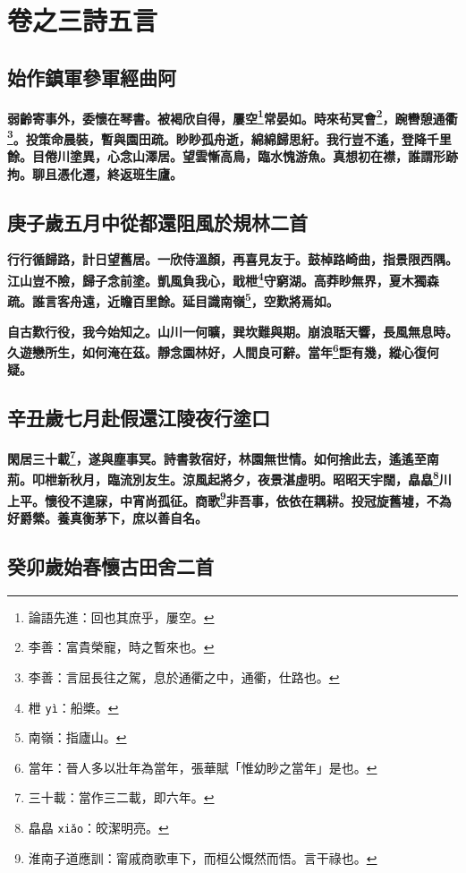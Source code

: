 \chapter{卷之三\hspace{1ex}詩五言}

\section{始作鎮軍參軍經曲阿}

\textbf{弱齡寄事外，委懷在琴書。被褐欣自得，屢空\footnote{論語先進：回也其庶乎，屢空。}常晏如。時來茍冥會\footnote{李善：富貴榮寵，時之暫來也。}，踠轡憩通衢\footnote{李善：言屈長往之駕，息於通衢之中，通衢，仕路也。}。投策命晨裝，暫與園田疏。眇眇孤舟逝，綿綿歸思紆。我行豈不遙，登降千里餘。目倦川塗異，心念山澤居。望雲慚高鳥，臨水愧游魚。真想初在襟，誰謂形跡拘。聊且憑化遷，終返班生廬。}

\section{庚子歲五月中從都還阻風於規林二首}

\textbf{行行循歸路，計日望舊居。一欣侍溫顏，再喜見友于。鼓棹路崎曲，指景限西隅。江山豈不險，歸子念前塗。凱風負我心，戢枻\footnote{枻 \texttt{yì}：船槳。}守窮湖。高莽眇無界，夏木獨森疏。誰言客舟遠，近瞻百里餘。延目識南嶺\footnote{南嶺：指廬山。}，空歎將焉如。}

\textbf{自古歎行役，我今始知之。山川一何曠，巽坎難與期。崩浪聒天響，長風無息時。久遊戀所生，如何淹在茲。靜念園林好，人間良可辭。當年\footnote{當年：晉人多以壯年為當年，張華賦「惟幼眇之當年」是也。}詎有幾，縱心復何疑。}

\section{辛丑歲七月赴假還江陵夜行塗口}

\textbf{閑居三十載\footnote{三十載：當作三二載，即六年。}，遂與塵事冥。詩書敦宿好，林園無世情。如何捨此去，遙遙至南荊。叩枻新秋月，臨流別友生。涼風起將夕，夜景湛虛明。昭昭天宇闊，皛皛\footnote{皛皛 \texttt{xiǎo}：皎潔明亮。}川上平。懷役不遑寐，中宵尚孤征。商歌\footnote{淮南子道應訓：甯戚商歌車下，而桓公慨然而悟。言干祿也。}非吾事，依依在耦耕。投冠旋舊墟，不為好爵縈。養真衡茅下，庶以善自名。}

\section{癸卯歲始春懷古田舍二首}

